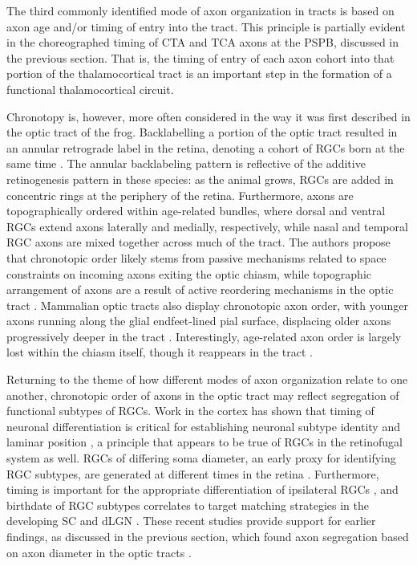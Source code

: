 The third commonly identified mode of axon organization in tracts is based on axon age and/or timing of entry into the tract. 
This principle is partially evident in the choreographed timing of CTA and TCA axons at the PSPB, discussed in the previous section.
That is, the timing of entry of each axon cohort into that portion of the thalamocortical tract is an important step in the formation of a functional thalamocortical circuit.

Chronotopy is, however, more often considered in the way it was first described in the optic tract of the frog.
Backlabelling a portion of the optic tract resulted in an annular retrograde label in the retina, denoting a cohort of RGCs born at the same time \cite{fawcett1984fibre,reh1983organization}.
The annular backlabeling pattern is reflective of the additive retinogenesis pattern in these species: as the animal grows, RGCs are added in concentric rings at the periphery of the retina.
Furthermore, axons are topographically ordered within age-related bundles, where dorsal and ventral RGCs extend axons laterally and medially, respectively, while nasal and temporal RGC axons are mixed together across much of the tract.
The authors propose that chronotopic order likely stems from passive mechanisms related to space constraints on incoming axons exiting the optic chiasm, while topographic arrangement of axons are a result of active reordering mechanisms in the optic tract \cite{reh1983organization}.
Mammalian optic tracts also display chronotopic axon order, with younger axons running along the glial endfeet-lined pial surface, displacing older axons progressively deeper in the tract \cite{colello1992observations,reese1987distributionrat,reese1990fibre,reese1997chronotopic,walsh1985age}. %
Interestingly, age-related axon order is largely lost within the chiasm itself, though it reappears in the tract \cite{colello1998changing}. %

Returning to the theme of how different modes of axon organization relate to one another, chronotopic order of axons in the optic tract may reflect segregation of functional subtypes of RGCs.
Work in the cortex has shown that timing of neuronal differentiation is critical for establishing neuronal subtype identity and laminar position \cite{molyneaux2007neuronal}, a principle that appears to be true of RGCs in the retinofugal system as well.
RGCs of differing soma diameter, an early proxy for identifying RGC subtypes, are generated at different times in the retina \cite{rapaport1995spatiotemporal,reese1994birthdates}.
Furthermore, timing is important for the appropriate differentiation of ipsilateral RGCs \cite{bhansali2014delayed}, and birthdate of RGC subtypes correlates to target matching strategies in the developing SC and dLGN \cite{osterhout2014birthdate}.
These recent studies provide support for earlier findings, as discussed in the previous section, which found axon segregation based on axon diameter in the optic tracts \cite{reese1987distributionrat,guillery1982arrangement,torrealba1982studies,reese1990fibre}.

